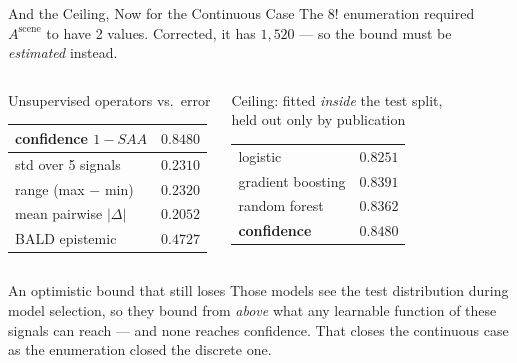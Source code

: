 \documentclass[aspectratio=169,11pt]{beamer}
\begin{document}
\begin{frame}{And the Ceiling, Now for the Continuous Case}
\small
The $8!$ enumeration required $A^{\text{scene}}$ to have 2 values. Corrected, it has $1{,}520$ --- so the bound must be \emph{estimated} instead.
\vspace{1mm}
\begin{columns}[T]
\begin{center}
\scriptsize Unsupervised operators vs.\ error
\vspace{1mm}

\begin{tabular}{@{}l c@{}}
\toprule
confidence $1-SAA$ & $\mathbf{0.8480}$ \\
\midrule
std over 5 signals & $0.2310$ \\
range (max $-$ min) & $0.2320$ \\
mean pairwise $|\Delta|$ & $0.2052$ \\
BALD epistemic & $0.4727$ \\
\bottomrule
\end{tabular}
\end{center}

\begin{center}
\scriptsize Ceiling: fitted \emph{inside} the test split,\\held out only by publication
\vspace{1mm}

\begin{tabular}{@{}l c@{}}
\toprule
logistic & $0.8251$ \\
gradient boosting & $0.8391$ \\
random forest & $0.8362$ \\
\midrule
\textbf{confidence} & $\mathbf{0.8480}$ \\
\bottomrule
\end{tabular}
\end{center}
\end{columns}
\vspace{1mm}
\begin{alertblock}{\small An optimistic bound that still loses}
\footnotesize Those models see the test distribution during model selection, so they bound from \emph{above} what any learnable function of these signals can reach --- and none reaches confidence. That closes the continuous case as the enumeration closed the discrete one.
\end{alertblock}
\end{frame}
\end{document}
